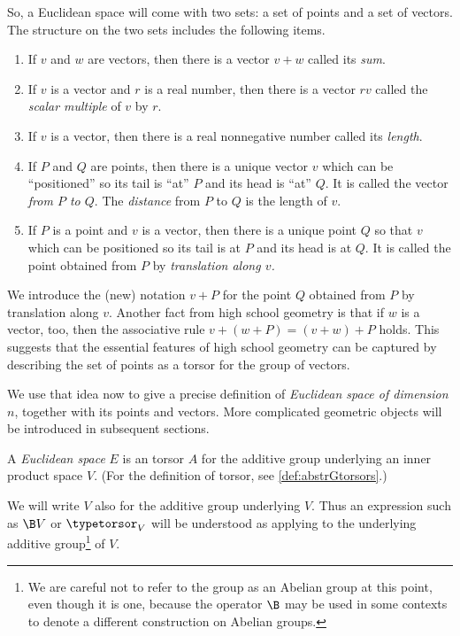 So, a Euclidean space will come with two sets: a set of points and a set of
vectors.  The structure on the two sets includes the following items.

\begin{enumerate}
\item If $v$ and $w$ are vectors, then there is a vector $v+w$ called its {\em
  sum}.
\item If $v$ is a vector and $r$ is a real number, then there is a vector $rv$
  called the {\em scalar multiple} of $v$ by $r$.
\item If $v$ is a vector, then there is a real nonnegative number called its
  {\em length}.
\item If $P$ and $Q$ are points, then
  there is a unique vector $v$ which can be ``positioned'' so its tail is ``at''
  $P$ and its head is ``at'' $Q$.  It is called the vector {\em from $P$ to
    $Q$}.  The {\em distance} from $P$ to $Q$ is the length of $v$.  
\item If $P$ is a point and $v$ is a vector, then there is a unique point $Q$
  so that $v$ which can be positioned so its tail is at
  $P$ and its head is at $Q$.  It is called the point obtained from $P$ by {\em
    translation along $v$.}
\end{enumerate}

We introduce the (new) notation $v+P$ for the point $Q$ obtained from $P$ by
translation along $v$.  Another fact from high school geometry is that if $w$
is a vector, too, then the associative rule $v+(w+P) = (v+w)+P$ holds.  This
suggests that the essential features of high school geometry can be captured by
describing the set of points as a torsor for the group of vectors.

We use that idea now to give a precise definition of {\em Euclidean space of
  dimension $n$}, together with its points and vectors.  More complicated
geometric objects will be introduced in subsequent sections.

\begin{definition}\label{def:EuclideanSpace}
  A {\em Euclidean space} $E$ is an torsor $A$ for the additive group
  underlying an inner product space $V$.  (For the definition of torsor, see
  \cref{def:abstrGtorsors}.)
\end{definition}

We will write $V$ also for the additive group underlying $V$.  Thus an
expression such as $\B V$ or $\typetorsor_V$ will be understood as applying to
the underlying additive group\footnote{We are careful not to refer to the group
  as an Abelian group at this point, even though it is one, because the
  operator $\B$ may be used in some contexts to denote a different construction
  on Abelian groups.}
of $V$.

